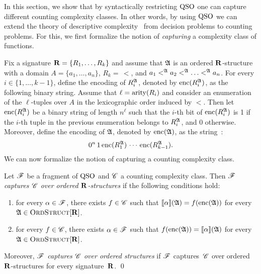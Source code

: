 
In this section, we show that by syntactically restricting ${\rm QSO}$ one can capture different counting complexity classes. 
In other words, by using ${\rm QSO}$ we can extend the theory of descriptive complexity~\cite{immerman1999descriptive} from decision problems to counting problems. 
For this, we first formalize the notion of \emph{capturing} a complexity class of functions.

Fix a signature $\mathbf{R} = \{R_1, \ldots, R_k\}$ and assume that $\mathfrak{A}$ is an ordered $\mathbf{R}$-structure with a domain $A = \{a_1, \ldots, a_n\}$, $R_k =\, <$, and $a_1 <^{\mathfrak{A}} a_2 <^{\mathfrak{A}} \ldots <^{\mathfrak{A}} a_n$. For every $i \in \{1, \ldots, k-1\}$, define the encoding of $R_i^{\mathfrak{A}}$, denoted by ${\rm enc}(R_i^{\mathfrak{A}})$, as the following binary string. Assume that $\ell = {\rm arity}(R_i)$ and consider an enumeration of the $\ell$-tuples over $A$ in the lexicographic order induced by $<$. 
Then let ${\rm enc}(R_i^{\mathfrak{A}})$ be a binary string of length $n^\ell$ such that the $i$-th bit of ${\rm enc}(R_i^{\mathfrak{A}})$ is 1 if the $i$-th tuple in the previous enumeration belongs to $R_i^{\mathfrak{A}}$, and 0 otherwise. Moreover, define the encoding of $\mathfrak{A}$, denoted by ${\rm enc}(\mathfrak{A})$, as the string~\cite{L04}:
$$
0^n \, 1 \, {\rm enc}(R_1^{\mathfrak{A}}) \, \cdots \, {\rm enc}(R_{k-1}^{\mathfrak{A}}).
$$
We can now formalize the notion of capturing a counting complexity class.
\begin{defi} \label{def:cap}
	Let $\mathscr{F}$ be a fragment of ${\rm QSO}$ and $\mathscr{C}$ a counting complexity class. Then {\em  $\mathscr{F}$ captures $\mathscr{C}$ over ordered $\mathbf{R}$-structures} if the  following conditions hold:
	\begin{enumerate}
		\item for every $\alpha \in \mathscr{F}$, there exists $f \in \mathscr{C}$ such that ${\llbracket{}{\alpha}\rrbracket}(\mathfrak{A}) = f({\rm enc}(\mathfrak{A}))$ for every $\mathfrak{A} \in \text{\sc OrdStruct}[\mathbf{R}]$. 
		
		\item for every $f \in \mathscr{C}$, there exists $\alpha \in \mathscr{F}$ such that   $f({\rm enc}(\mathfrak{A})) = {\llbracket{}{\alpha}\rrbracket}(\mathfrak{A})$ for every $\mathfrak{A} \in \text{\sc OrdStruct}[\mathbf{R}]$.
	\end{enumerate} 
	Moreover, {\em $\mathscr{F}$ captures $\mathscr{C}$ over ordered structures} if $\mathscr{F}$ captures~$\mathscr{C}$ over ordered $\mathbf{R}$-structures for every signature~$\mathbf{R}$. \qed
\end{defi}
